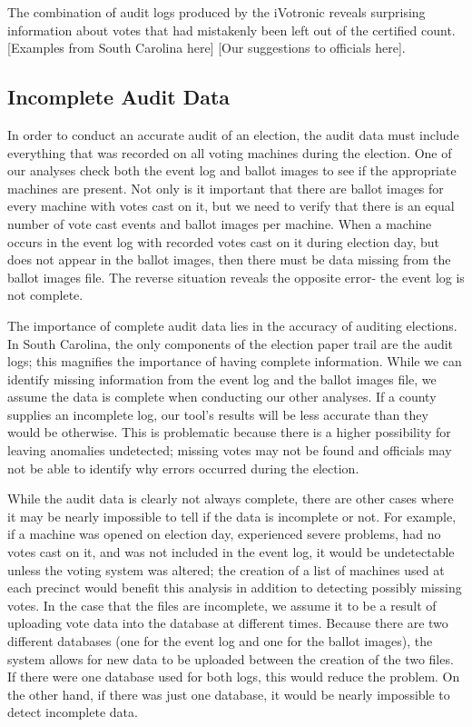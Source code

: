 The combination of audit logs produced by the iVotronic reveals surprising information about votes that had mistakenly been left out of the certified count. [Examples from South Carolina here] [Our suggestions to officials here].

\subsection{Incomplete Audit Data}
In order to conduct an accurate audit of an election, the audit data must include everything that was recorded on all voting machines during the election.  One of our analyses check both the event log and ballot images to see if the appropriate machines are present.  Not only is it important that there are ballot images for every machine with votes cast on it, but we need to verify that there is an equal number of vote cast events and ballot images per machine.  When a machine occurs in the event log with recorded votes cast on it during election day, but does not appear in the ballot images, then there must be data missing from the ballot images file.  The reverse situation reveals the opposite error- the event log is not complete.  

The importance of complete audit data lies in the accuracy of auditing elections.  In South Carolina, the only components of the election paper trail are the audit logs; this magnifies the importance of having complete information.  While we can identify missing information from the event log and the ballot images file, we assume the data is complete when conducting our other analyses.  If a county supplies an incomplete log, our tool's results will be less accurate than they would be otherwise.  This is problematic because there is a higher possibility for leaving anomalies undetected; missing votes may not be found and officials may not be able to identify why errors occurred during the election.  

While the audit data is clearly not always complete, there are other cases where it may be nearly impossible to tell if the data is incomplete or not.  For example, if a machine was opened on election day, experienced severe problems, had no votes cast on it, and was not included in the event log, it would be undetectable unless the voting system was altered; the creation of a list of machines used at each precinct would benefit this analysis in addition to detecting possibly missing votes.  In the case that the files are incomplete, we assume it to be a result of uploading vote data into the database at different times.  Because there are two different databases (one for the event log and one for the ballot images), the system allows for new data to be uploaded between the creation of the two files.  If there were one database used for both logs, this would reduce the problem.  On the other hand, if there was just one database, it would be nearly impossible to detect incomplete data.    

